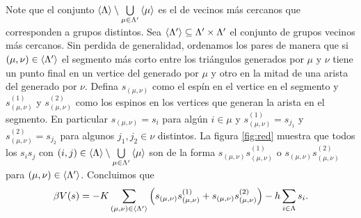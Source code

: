 \documentclass{article}
\begin{document}
\begin{enumerate}
Note que el conjunto $\ev{\Lambda}\setminus\bigcup\limits_{\mu\in\Lambda'}\ev{\mu}$ es el de vecinos más cercanos que corresponden a grupos distintos. Sea $\ev{\Lambda'}\subseteq\Lambda'\times\Lambda'$ el conjunto de grupos vecinos más cercanos. Sin perdida de generalidad, ordenamos los pares de manera que si $(\mu,\nu)\in\ev{\Lambda'}$ el segmento más corto entre los triángulos generados por $\mu$ y $\nu$ tiene un punto final en un vertice del generado por $\mu$ y otro en la mitad de una arista del generado por $\nu$. Defina $s_{(\mu,\nu)}$ como el espín en el vertice en el segmento y $s_{(\mu,\nu)}^{(1)}$ y $s_{(\mu,\nu)}^{(2)}$ como los espinos en los vertices que generan la arista en el segmento. En particular $s_{(\mu,\nu)}=s_i$ para algún $i\in\mu$ y $s_{(\mu,\nu)}^{(1)}=s_{j_1}$ y $s_{(\mu,\nu)}^{(2)}=s_{j_2}$ para algunos $j_1,j_2\in\nu$ distintos. La figura \ref{fig:red} muestra que todos los $s_is_j$ con $(i,j)\in\ev{\Lambda}\setminus\bigcup\limits_{\mu\in\Lambda'}\ev{\mu}$ son de la forma $s_{(\mu,\nu)}s_{(\mu,\nu)}^{(1)}$ o $s_{(\mu,\nu)}s_{(\mu,\nu)}^{(2)}$ para $(\mu,\nu)\in\ev{\Lambda'}$. Concluimos que 
\begin{equation}
\beta V(s)=-K\sum_{(\mu,\nu)\in\ev{\Lambda'}}\qty(s_{(\mu,\nu)}s_{(\mu,\nu)}^{(1)}+s_{(\mu,\nu)}s_{(\mu,\nu)}^{(2)})-h\sum_{i\in\Lambda}s_i.
\end{equation}


\end{enumerate}
\end{document}
